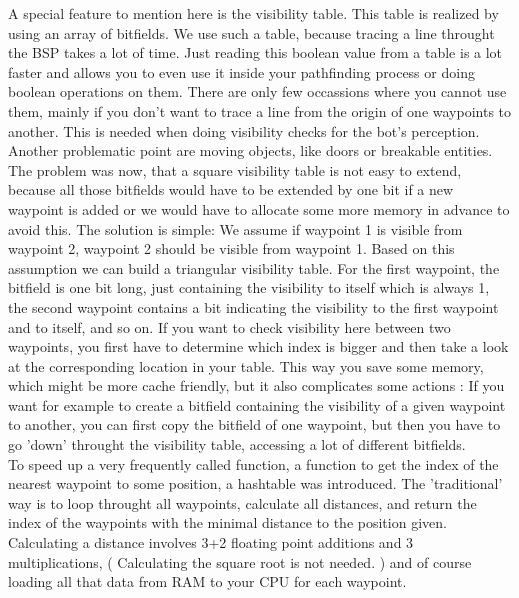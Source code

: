 \documentclass[12pt]{article}
\begin{document}
A special feature to mention here is the visibility table. This table is realized by using an array of bitfields. We use such a table, because tracing a line throught the BSP takes a lot of time. Just reading this boolean value from a table is a lot faster and allows you to even use it inside your pathfinding process or doing boolean operations on them. There are only few occassions where you cannot use them, mainly if you don't want to trace a line from the origin of one waypoints to another. This is needed when doing visibility checks for the bot's perception. Another problematic point are moving objects, like doors or breakable entities.\\
The problem was now, that a square visibility table is not easy to extend, because all those bitfields would have to be extended by one bit if a new waypoint is added or we would have to allocate some more memory in advance to avoid this. The solution is simple: We assume if waypoint 1 is visible from waypoint 2, waypoint 2 should be visible from waypoint 1. Based on this assumption we can build a triangular visibility table. For the first waypoint, the bitfield is one bit long, just containing the visibility to itself which is always 1, the second waypoint contains a bit indicating the visibility to the first waypoint and to itself, and so on. If you want to check visibility here between two waypoints, you first have to determine which index is bigger and then take a look at the corresponding location in your table. This way you save some memory, which might be more cache friendly, but it also complicates some actions : If you want for example to create a bitfield containing the visibility of a given waypoint to another, you can first copy the bitfield of one waypoint, but then you have to go 'down' throught the visibility table, accessing a lot of different bitfields.\\
To speed up a very frequently called function, a function to get the index of the nearest waypoint to some position, a hashtable was introduced. The 'traditional' way is to loop throught all waypoints, calculate all distances, and return the index of the waypoints with the minimal distance to the position given. Calculating a distance involves 3+2 floating point additions and 3 multiplications, ( Calculating the square root is not needed. ) and of course loading all that data from RAM to your CPU for each waypoint.\\
\end{document}
